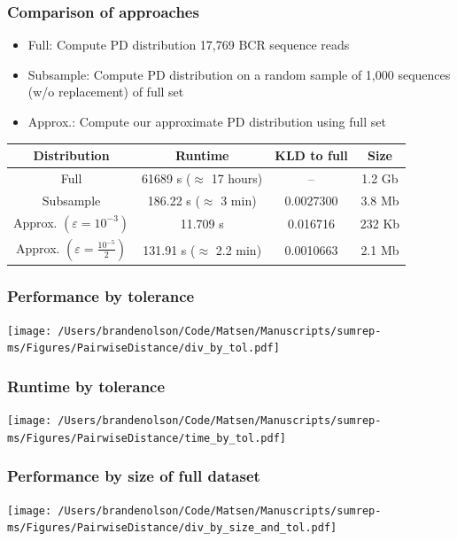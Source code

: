 \documentclass[mathserif,compress]{beamer}
\newcommand*\eps{\epsilon}
\renewcommand\;{\,}
\renewcommand\epsilon{\varepsilon}
\begin{document}
\begin{frame}\frametitle{Comparison of approaches}
\begin{center}
\begin{itemize}
\item Full: Compute PD distribution 17,769 BCR sequence reads
\item Subsample: Compute PD distribution on a random sample of 1,000 sequences (w/o replacement) of full set
\item Approx.: Compute our approximate PD distribution using full set
\end{itemize}
\bigskip
\begin{tabular}{c|c|c|c}
Distribution & Runtime & KLD to full & Size \\
\hline
Full & 61689 s ($\approx$ 17 hours) &  -- & 1.2 Gb \\
Subsample & 186.22 s ($\approx$ 3 min) & 0.0027300 & 3.8 Mb \\
Approx. $\left(\eps = 10^{-3}\right)$ & 11.709 s & 0.016716 & 232 Kb\\
Approx. $\left(\eps = \frac{10^{-5}}{2}\right)$ & 131.91 s ($\approx$ 2.2 min) & 0.0010663 & 2.1 Mb
\end{tabular}
\end{center}
\end{frame}

\begin{frame}\frametitle{Performance by tolerance}
\begin{center}
\texttt{[image: /Users/brandenolson/Code/Matsen/Manuscripts/sumrep-ms/Figures/PairwiseDistance/div\_by\_tol.pdf]}
\end{center}
\end{frame}

\begin{frame}\frametitle{Runtime by tolerance}
\begin{center}
\texttt{[image: /Users/brandenolson/Code/Matsen/Manuscripts/sumrep-ms/Figures/PairwiseDistance/time\_by\_tol.pdf]}
\end{center}
\end{frame}

\begin{frame}\frametitle{Performance by size of full dataset}
\begin{center}
\texttt{[image: /Users/brandenolson/Code/Matsen/Manuscripts/sumrep-ms/Figures/PairwiseDistance/div\_by\_size\_and\_tol.pdf]}
\end{center}
\end{frame}
\end{document}
